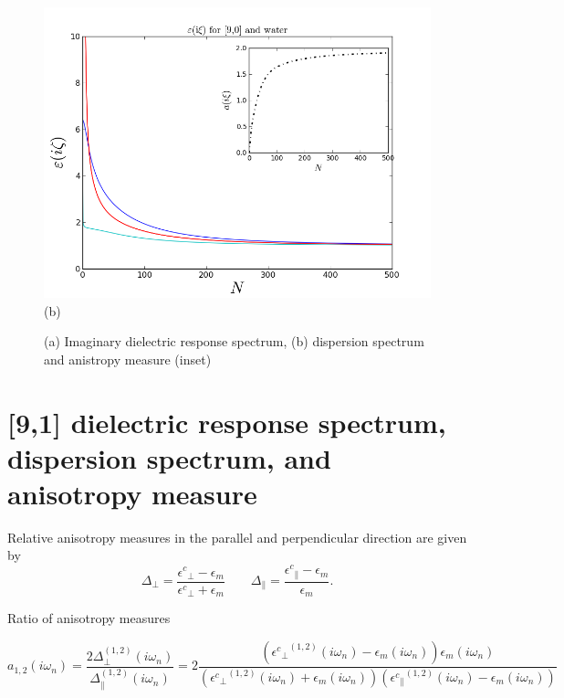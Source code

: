 \documentclass[a4paper]{article}
\begin{document}
\begin{center}
\begin{figure}[t!]
\begin{center}
\begin{minipage}[b]{0.40\textwidth}
\end{minipage}
\hskip 43pt
\begin{minipage}[b]{0.40\textwidth}
\begin{center}
\includegraphics[width=1.4\textwidth]{prop_plots/90w90_eiz.png} (b)
\end{center}
\end{minipage}
\caption{(a) Imaginary dielectric response spectrum, (b) dispersion spectrum and anistropy measure (inset)}
\label{eiz91}
\end{center}
\end{figure} 

\section{[9,1] dielectric response spectrum, dispersion spectrum, and anisotropy measure}
Relative anisotropy measures in the parallel and perpendicular direction are given by
\begin{equation}
\Delta_{\perp}=\frac{{\epsilon^{c}}_{\perp}-\epsilon_{m}}{{\epsilon^{c}}_{\perp}+\epsilon_{m}}\qquad\Delta_{\parallel}=\frac{{\epsilon^{c}}_{\parallel}-\epsilon_{m}}{\epsilon_{m}}.
\label{anisoind}
\end{equation}

Ratio of anisotropy measures

\begin{equation}
a_{1,2}(i \omega_n) = \frac{2 \Delta_{\perp}^{(1,2)}(i \omega_n)}{\Delta_{\parallel}^{(1,2)}(i \omega_n)} = 2 \frac{({{\epsilon^{c}}_{\perp}}^{(1,2)}(i \omega_n) -\epsilon_{m}(i \omega_n)) \epsilon_{m}(i \omega_n)}{({{\epsilon^{c}}_{\perp}}^{(1,2)}(i \omega_n)+\epsilon_{m}(i \omega_n)) ({{\epsilon^{c}}_{\parallel}}^{(1,2)}(i \omega_n) -\epsilon_{m}(i \omega_n))}
\label{eq:adef}
\end{equation}


\end{center}
\end{document}
